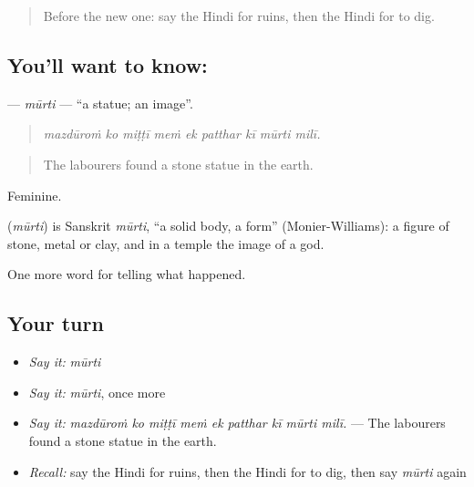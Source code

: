 \label{lesson:HI-C326-murti}



\begin{quote}
Before the new one: say the Hindi for ruins, then the Hindi for to dig.
\end{quote}

\subsection*{You'll want to know: }
\textbf{} — \emph{mūrti} — \textquotedblleft{}a statue; an image\textquotedblright{}.

\begin{quote}
        
\end{quote}

\begin{quote}
\emph{mazdūroṁ ko miṭṭī meṁ ek patthar kī mūrti milī.}
\end{quote}

\begin{quote}
The labourers found a stone statue in the earth.
\end{quote}

Feminine.

\begin{cousinweb}
\textbf{} (\emph{mūrti}) is Sanskrit \emph{mūrti}, \textquotedblleft{}a solid body, a form\textquotedblright{} (Monier-Williams): a figure of stone, metal or clay, and in a temple the image of a god.
\end{cousinweb}

\begin{grammarlens}[title={What you've built}]
One more word for telling what happened.
\end{grammarlens}

\subsection*{Your turn}
\begin{itemize}
\raggedright
  \item \emph{Say it:} \emph{mūrti}
  \item \emph{Say it:} \emph{mūrti}, once more
  \item \emph{Say it:} \emph{mazdūroṁ ko miṭṭī meṁ ek patthar kī mūrti milī.} — The labourers found a stone statue in the earth.
  \item \emph{Recall:} say the Hindi for ruins, then the Hindi for to dig, then say \emph{mūrti} again
\end{itemize}

